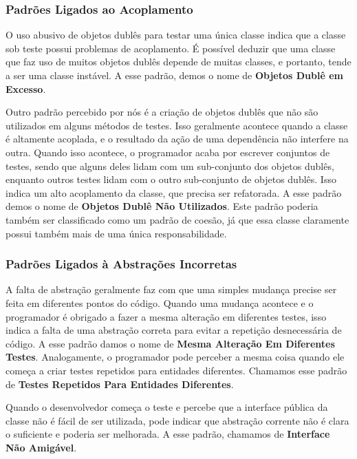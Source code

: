 \documentclass[conference]{IEEEtran}
\begin{document}
\subsubsection{Padrões Ligados ao Acoplamento}

O uso abusivo de objetos dublês para testar uma
única classe indica que a classe sob teste possui problemas
de acoplamento. É possível deduzir que uma classe que faz uso de muitos
objetos dublês depende de muitas classes, e portanto, tende a ser
uma classe instável. A esse padrão, demos o nome de \textbf{Objetos Dublê em Excesso}.

Outro padrão percebido por nós é a criação de objetos dublês que não
são utilizados em alguns métodos de testes. Isso geralmente acontece quando
a classe é altamente acoplada, e o resultado da ação de uma dependência não
interfere na outra. Quando isso acontece, o programador acaba por escrever
conjuntos de testes, sendo que alguns deles lidam com um sub-conjunto dos objetos dublês,
enquanto outros testes lidam com o outro sub-conjunto de objetos dublês. 
Isso indica um alto acoplamento 
da classe, que precisa ser refatorada. A esse padrão demos o nome de
\textbf{Objetos Dublê Não Utilizados}. Este padrão poderia também ser classificado
como um padrão de coesão, já que essa classe claramente possui também mais de uma
única responsabilidade.

\subsubsection{Padrões Ligados à Abstrações Incorretas}

A falta de abstração geralmente faz com que uma simples mudança precise
ser feita em diferentes pontos do código. Quando uma mudança acontece e 
o programador é obrigado a fazer a mesma alteração em diferentes testes,
isso indica a falta de uma abstração correta para evitar a 
repetição desnecessária de código.
A esse padrão damos o nome de \textbf{Mesma Alteração Em Diferentes Testes}.
Analogamente, o programador pode perceber a mesma coisa
quando ele começa a criar testes repetidos para entidades diferentes.
Chamamos esse padrão de \textbf{Testes Repetidos Para Entidades Diferentes}.

Quando o desenvolvedor começa o teste e percebe que a interface pública da classe
não é fácil de ser utilizada, pode indicar que abstração
corrente não é clara o suficiente e poderia ser melhorada. A esse padrão,
chamamos de \textbf{Interface Não Amigável}.
\end{document}

